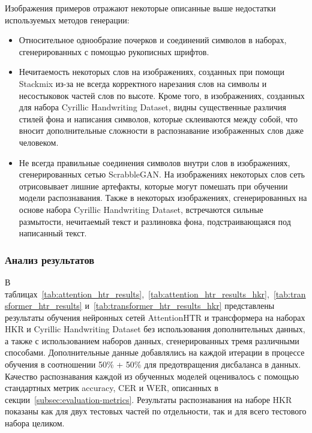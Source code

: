 Изображения примеров отражают некоторые описанные выше недостатки используемых методов генерации:
\begin{itemize}
    \item Относительное однообразие почерков и соединений символов в наборах, сгенерированных с помощью рукописных шрифтов.
    \item Нечитаемость некоторых слов на изображениях, созданных при помощи Stackmix из-за не всегда корректного нарезания
    слов на символы и несостыковок частей слов по высоте.
    Кроме того, в изображениях, созданных для набора Cyrillic Handwriting Dataset, видны существенные различия стилей фона и написания символов,
    которые склеиваются между собой, что вносит дополнительные сложности в распознавание изображенных слов даже человеком.
    \item Не всегда правильные соединения символов внутри слов в изображениях, сгенерированных сетью ScrabbleGAN.
    На изображениях некоторых слов сеть отрисовывает лишние артефакты, которые могут помешать при обучении модели распознавания.
    Также в некоторых изображениях, сгенерированных на основе набора Cyrillic Handwriting Dataset, встречаются сильные размытости, нечитаемый текст и
    разлиновка фона, подстраивающаяся под написанный текст.
\end{itemize}


\subsubsection{Анализ результатов}

В таблицах~\ref{tab:attention_htr_results},~\ref{tab:attention_htr_results_hkr},~\ref{tab:transformer_htr_results} и~\ref{tab:transformer_htr_results_hkr}
представлены результаты обучения нейронных сетей AttentionHTR и трансформера на наборах HKR и Cyrillic Handwriting Dataset
без использования дополнительных данных, а также с использованием наборов данных, сгенерированных тремя различными способами.
Дополнительные данные добавлялись на каждой итерации в процессе обучения в соотношении 50\% + 50\% для предотвращения дисбаланса в данных.
Качество распознавания каждой из обученных моделей оценивалось с помощью стандартных метрик accuracy, CER и WER, описанных в секции~\ref{subsec:evaluation-metrics}.
Результаты распознавания на наборе HKR показаны как для двух тестовых частей по отдельности, так и для всего тестового набора целиком.

